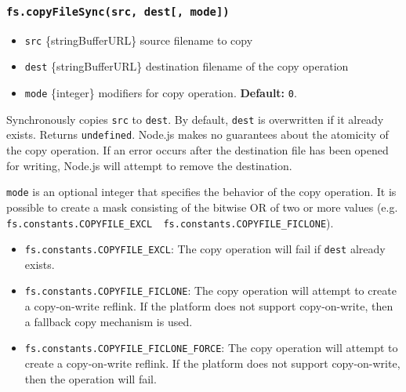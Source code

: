 \subsubsection{\texorpdfstring{\texttt{fs.copyFileSync(src,\ dest{[},\ mode{]})}}{fs.copyFileSync(src, dest{[}, mode{]})}}\label{fs.copyfilesyncsrc-dest-mode}

\begin{itemize}
\tightlist
\item
  \texttt{src} \{string\textbar Buffer\textbar URL\} source filename to
  copy
\item
  \texttt{dest} \{string\textbar Buffer\textbar URL\} destination
  filename of the copy operation
\item
  \texttt{mode} \{integer\} modifiers for copy operation.
  \textbf{Default:} \texttt{0}.
\end{itemize}

Synchronously copies \texttt{src} to \texttt{dest}. By default,
\texttt{dest} is overwritten if it already exists. Returns
\texttt{undefined}. Node.js makes no guarantees about the atomicity of
the copy operation. If an error occurs after the destination file has
been opened for writing, Node.js will attempt to remove the destination.

\texttt{mode} is an optional integer that specifies the behavior of the
copy operation. It is possible to create a mask consisting of the
bitwise OR of two or more values (e.g.
\texttt{fs.constants.COPYFILE\_EXCL\ \textbar{}\ fs.constants.COPYFILE\_FICLONE}).

\begin{itemize}
\tightlist
\item
  \texttt{fs.constants.COPYFILE\_EXCL}: The copy operation will fail if
  \texttt{dest} already exists.
\item
  \texttt{fs.constants.COPYFILE\_FICLONE}: The copy operation will
  attempt to create a copy-on-write reflink. If the platform does not
  support copy-on-write, then a fallback copy mechanism is used.
\item
  \texttt{fs.constants.COPYFILE\_FICLONE\_FORCE}: The copy operation
  will attempt to create a copy-on-write reflink. If the platform does
  not support copy-on-write, then the operation will fail.
\end{itemize}

